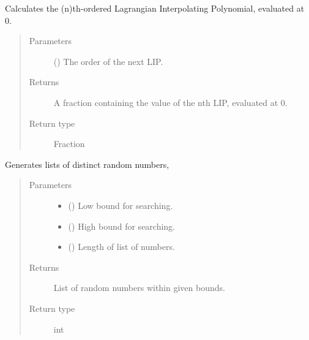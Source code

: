 \documentclass[letterpaper,10pt,english]{sphinxmanual}
\begin{document}
\begin{fulllineitems}
\label{\detokenize{index:Toolkit.nthOrderLag}}
Calculates the (n)th-ordered Lagrangian Interpolating Polynomial, evaluated at 0.
\begin{quote}\begin{description}
\item[{Parameters}] \leavevmode
{} () \textendash{} The order of the next LIP.

\item[{Returns}] \leavevmode
A fraction containing the value of the nth LIP, evaluated at 0.

\item[{Return type}] \leavevmode
Fraction

\end{description}\end{quote}

\end{fulllineitems}


\begin{fulllineitems}
\label{\detokenize{index:Toolkit.random_distinct}}
Generates lists of distinct random numbers,
\begin{quote}\begin{description}
\item[{Parameters}] \leavevmode\begin{itemize}
\item {} 
 () \textendash{} Low bound for searching.

\item {} 
 () \textendash{} High bound for searching.

\item {} 
 () \textendash{} Length of list of numbers.

\end{itemize}

\item[{Returns}] \leavevmode
List of random numbers within given bounds.

\item[{Return type}] \leavevmode
int

\end{description}\end{quote}

\end{fulllineitems}
\end{document}
